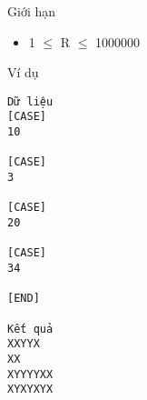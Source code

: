 Giới hạn
\begin{itemize}
	\item     1  $\le$  R  $\le$  1000000   
\end{itemize}
Ví dụ
\begin{verbatim}
Dữ liệu
[CASE]
10

[CASE]
3

[CASE]
20

[CASE]
34

[END]

Kết quả
XXYYX
XX
XYYYYXX
XYXYXYX
\end{verbatim}